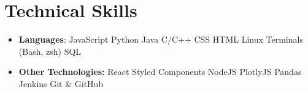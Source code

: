 \documentclass[letterpaper,11pt]{article}
\newcommand{\resumeSubHeadingListStart}{\begin{itemize}[label=, leftmargin=0em]}
\newcommand{\resumeSubHeadingListEnd}{\end{itemize}}
\begin{document}
%
\section{Technical Skills}
 \resumeSubHeadingListStart
   \item{
     \textbf{Languages}{: JavaScript \textbar{} Python \textbar{} Java \textbar{} C/C++  \textbar{} CSS \textbar{} HTML \textbar{} Linux Terminals (Bash, zsh) \textbar{} SQL}
   }
   \item{
      \textbf{Other Technologies:} React \textbar{} Styled Components \textbar{} NodeJS \textbar{} PlotlyJS \textbar{} Pandas \textbar{} Jenkins \textbar{} Git \& GitHub
    }
 \resumeSubHeadingListEnd
\end{document}
